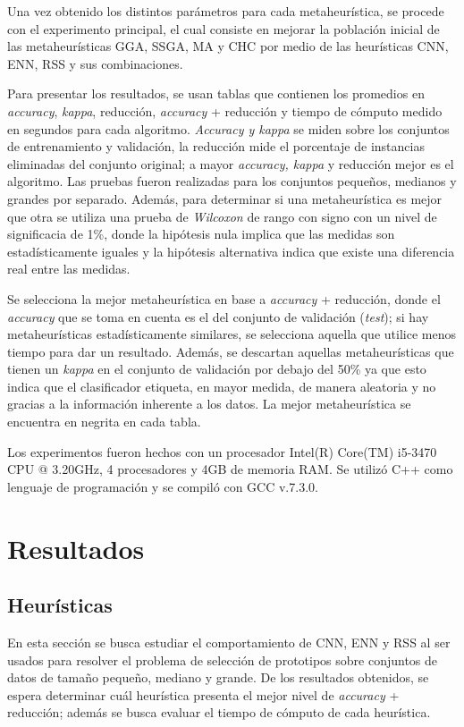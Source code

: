 Una vez obtenido los distintos parámetros para cada metaheurística, se procede con el experimento principal, el cual consiste en mejorar la población inicial de las metaheurísticas GGA, SSGA, MA y CHC por medio de las heurísticas CNN, ENN, RSS y sus combinaciones.

Para presentar los resultados, se usan tablas que contienen los promedios en \emph{accuracy}, \emph{kappa}, reducción, \emph{accuracy} + reducción y tiempo de cómputo medido en segundos para cada algoritmo. \emph{Accuracy y kappa} se miden sobre los conjuntos de entrenamiento y validación, la reducción mide el porcentaje de instancias eliminadas del conjunto original; a mayor \emph{accuracy, kappa} y reducción mejor es el algoritmo. Las pruebas fueron realizadas para los conjuntos pequeños, medianos y grandes por separado. Además, para determinar si una metaheurística es mejor que otra se utiliza una prueba de \emph{Wilcoxon} de rango con signo con un nivel de significacia de 1\%, donde la hipótesis nula implica que las medidas son estadísticamente iguales y la hipótesis alternativa indica que existe una diferencia real entre las medidas. 


Se selecciona la mejor metaheurística en base a \emph{accuracy} + reducción, donde el \emph{accuracy} que se toma en cuenta es el del conjunto de validación (\emph{test}); si hay metaheurísticas estadísticamente similares, se selecciona aquella que utilice menos tiempo para dar un resultado. Además, se descartan aquellas metaheurísticas que tienen un \emph{kappa} en el conjunto de validación por debajo del 50\% ya que esto indica que el clasificador etiqueta, en mayor medida, de manera aleatoria y no gracias a la información inherente a los datos. La mejor metaheurística se encuentra en negrita en cada tabla.

Los experimentos fueron hechos con un procesador Intel(R) Core(TM) i5-3470 CPU @ 3.20GHz, 4 procesadores y 4GB de memoria RAM. Se utilizó C++ como lenguaje de programación y se compiló con GCC v.7.3.0.

\section{Resultados}

\subsection{Heurísticas}

En esta sección se busca estudiar el comportamiento de CNN, ENN y RSS al ser usados para resolver el problema de selección de prototipos sobre conjuntos de datos de tamaño pequeño, mediano y grande. De los resultados obtenidos, se espera determinar cuál heurística presenta el mejor nivel de \emph{accuracy} + reducción; además se busca evaluar el tiempo de cómputo de cada heurística.


